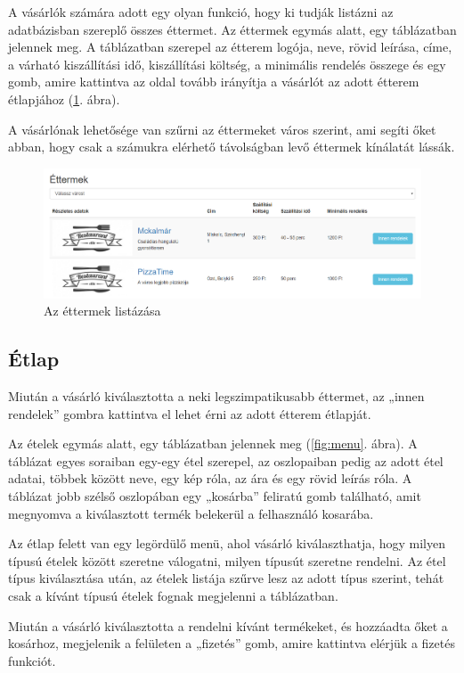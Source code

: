 A vásárlók számára adott egy olyan funkció, hogy ki tudják listázni az adatbázisban szereplő összes éttermet. Az éttermek egymás alatt, egy táblázatban jelennek meg. A táblázatban szerepel az étterem logója, neve, rövid leírása, címe, a várható kiszállítási idő, kiszállítási költség, a minimális rendelés összege és egy gomb, amire kattintva az oldal tovább irányítja a vásárlót az adott étterem étlapjához (\ref{fig:restaurants}. ábra).

A vásárlónak lehetősége van szűrni az éttermeket város szerint, ami segíti őket abban, hogy csak a számukra elérhető távolságban levő éttermek kínálatát lássák.

\begin{figure}
\centering
\includegraphics[scale=0.5]{kepek/restaurants.png}
\caption{Az éttermek listázása}
\label{fig:restaurants}
\end{figure}

\subsection{Étlap}

Miután a vásárló kiválasztotta a neki legszimpatikusabb éttermet, az „innen rendelek” gombra kattintva el lehet érni az adott étterem étlapját.

Az ételek egymás alatt, egy táblázatban jelennek meg (\ref{fig:menu}. ábra). A táblázat egyes soraiban egy-egy étel szerepel, az oszlopaiban pedig az adott étel adatai, többek között neve, egy kép róla, az ára és egy rövid leírás róla. A táblázat jobb szélső oszlopában egy „kosárba” feliratú gomb található, amit megnyomva a kiválasztott termék belekerül a felhasználó kosarába.

Az étlap felett van egy legördülő menü, ahol vásárló kiválaszthatja, hogy milyen típusú ételek között szeretne válogatni, milyen típusút szeretne rendelni. Az étel típus kiválasztása után, az ételek listája szűrve lesz az adott típus szerint, tehát csak a kívánt típusú ételek fognak megjelenni a táblázatban.

Miután a vásárló kiválasztotta a rendelni kívánt termékeket, és hozzáadta őket a kosárhoz, megjelenik a felületen a „fizetés” gomb, amire kattintva elérjük a fizetés funkciót.

